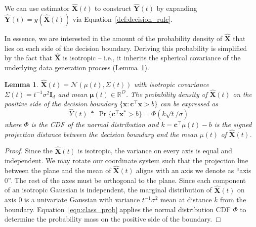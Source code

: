 \documentclass[12pt]{article}
\newtheorem{lemma}{Lemma}
\begin{document}
We can use estimator $\hat{\mathbf X}(t)$ to construct $\hat{\mathbf Y}(t)$ by expanding $\hat{\mathbf Y}(t) = y(\hat{\mathbf X}(t))$ via Equation~\ref{def:decision_rule}. 

In essence, we are interested in the amount of the probability density of $\hat{\mathbf X}$ that lies on each side of the decision boundary. 
Deriving this probability is simplified by the fact that $\hat{\mathbf X}$ is isotropic -- i.e., it inherits the spherical covariance of the underlying data generation process (Lemma~\ref{lemma:zscore}). 



\begin{lemma}
	\label{lemma:zscore}
	$\hat{\mathbf X}(t) = \mathcal N(\mu(t), \Sigma(t))$ with isotropic covariance $\Sigma(t) = t^{-1} \sigma^2 \mathbf I_d$ and mean $\mathbf \mu(t) \in \mathbb R^D$.
	The probability density of $\hat{\mathbf X}(t)$ on the positive side of the decision boundary $\{\mathbf x : \mathbf c^\top \mathbf x > b\}$ can be expressed as 
	\begin{equation}
		\label{eqn:class_prob}
        \hat Y(t) \triangleq
		\Pr\{\mathbf c^\top \mathbf x^* > b\} = \Phi(k\sqrt{t} / \sigma)
	\end{equation}
	where $\Phi$ is the CDF of the normal distribution and $k = \mathbf{c^\top}\mu(t) - b$ is the signed projection distance between the decision boundary and the mean $\mu(t)$ of $\hat{\mathbf X}(t)$. 
\end{lemma}
\begin{proof}
	Since the $\hat{\mathbf X}(t)$ is isotropic, the variance on every axis is equal and independent. 
	We may rotate our coordinate system such that the projection line between the plane and the mean of $\hat{\mathbf X}(t)$ aligns with an axis we denote as ``axis 0''. 
	The rest of the axes must be orthogonal to the plane. 
	Since each component of an isotropic Gaussian is independent, the marginal distribution of $\hat{\mathbf X}(t)$ on axis 0 is a univariate Gaussian with variance $t^{-1} \sigma^2$ mean at distance $k$ from the boundary. 
	Equation~\ref{eqn:class_prob} applies the normal distribution CDF $\Phi$ to determine the probability mass on the positive side of the boundary. 
\end{proof}


\end{document}
